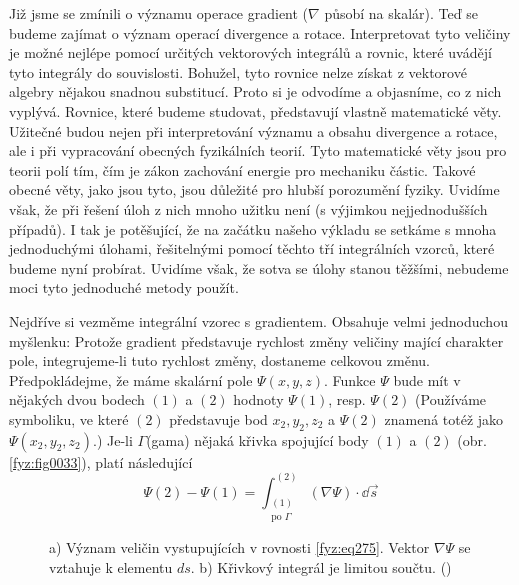       Již jsme se zmínili o významu operace gradient (\(\nabla\) působí na skalár). Teď se budeme  
      zajímat o význam operací divergence a rotace. Interpretovat tyto veličiny je možné nejlépe 
      pomocí určitých vektorových integrálů a rovnic, které uvádějí tyto integrály do souvislosti. 
      Bohužel, tyto rovnice nelze získat z vektorové algebry nějakou snadnou substitucí. Proto si je 
      odvodíme a objasníme, co z nich vyplývá. Rovnice, které budeme studovat, představují vlastně 
      matematické věty. Užitečné budou nejen při interpretování významu a obsahu divergence a rotace, 
      ale i při vypracování obecných fyzikálních teorií. Tyto matematické věty jsou pro teorii polí 
      tím, čím je zákon zachování energie pro mechaniku částic. Takové obecné věty, jako jsou tyto, 
      jsou důležité pro hlubší porozumění fyziky. Uvidíme však, že při řešení úloh z nich mnoho 
      užitku není (s výjimkou nejjednodušších případů). I tak je potěšující, že na začátku našeho 
      výkladu se setkáme s mnoha jednoduchými úlohami, řešitelnými pomocí těchto tří integrálních 
      vzorců, které budeme nyní probírat. Uvidíme však, že sotva se úlohy stanou těžšími, nebudeme 
      moci tyto jednoduché metody použít.
  
      Nejdříve si vezměme integrální vzorec s gradientem. Obsahuje velmi jednoduchou myšlenku: 
      Protože gradient představuje rychlost změny veličiny mající charakter pole, inte\-gru\-jeme-li 
      tuto rychlost změny, dostaneme celkovou změnu. Předpokládejme, že máme skalární pole \(\Psi(x, 
      y, z)\). Funkce \(\Psi\) bude mít v nějakých dvou bodech \((1)\) a \((2)\) hodnoty \(\Psi(1)\), 
      resp. \(\Psi(2)\) (Používáme symboliku, ve které \((2)\) představuje bod \(x_2, y_2, z_2\) a 
      \(\Psi(2)\) znamená totéž jako \(\Psi(x_2, y_2, z_2)\).) Je-li \(\Gamma\)(gama) nějaká 
      křivka spojující body \((1)\) a \((2)\) (obr. \ref{fyz:fig0033}), platí následující
      \begin{equation}\label{fyz:eq275}
        \Psi(2)-\Psi(1) = \int_{\substack{(1)\\\text{po }\Gamma}}^{(2)}(\nabla\Psi)\cdot\dd{\vec{s}}
      \end{equation} 
  
      \begin{figure}[ht!] 
        \centering
        \caption{a) Význam veličin vystupujících v rovnosti \ref{fyz:eq275}. Vektor 
        \(\nabla\Psi\) se vztahuje k elementu \(ds\). b) Křivkový integrál je limitou součtu. 	
                  (\cite[s.~46]{Feynman02})}
      \end{figure}
  
